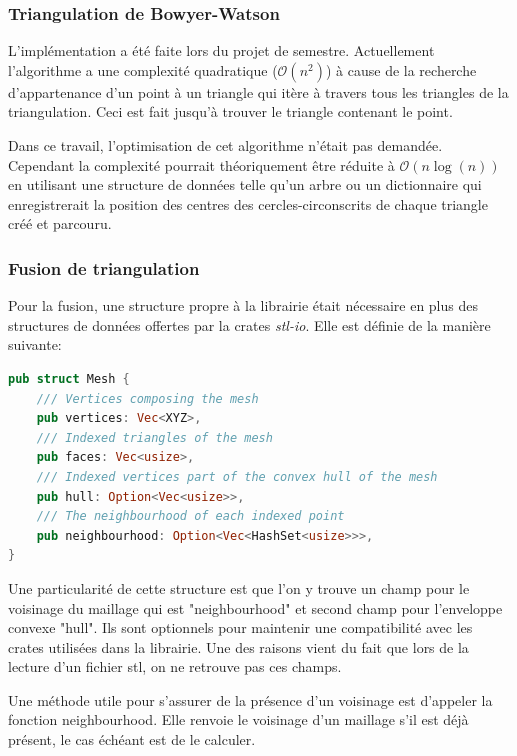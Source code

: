 \subsubsection{Triangulation de Bowyer-Watson}

L'implémentation a été faite lors du projet de semestre. 
Actuellement l'algorithme a une complexité quadratique ($\mathcal{O}(n^2)$) à cause de la 
recherche d'appartenance d'un point à un triangle qui itère à travers tous les
triangles de la triangulation. Ceci est fait jusqu'à trouver le triangle contenant le point.

Dans ce travail, l'optimisation de cet algorithme n'était pas demandée.
Cependant la complexité pourrait théoriquement être réduite à $\mathcal{O}(n \log(n))$ en
utilisant une structure de données telle qu'un arbre ou un dictionnaire
qui enregistrerait la position des centres des
cercles-circonscrits de chaque triangle créé et parcouru.

\subsubsection{Fusion de triangulation}

Pour la fusion, une structure propre à la librairie était nécessaire en plus des structures de données offertes par la crates \textit{stl-io}.
Elle est définie de la manière suivante:

\begin{lstlisting}[language=Rust, style=boxed]
pub struct Mesh {
    /// Vertices composing the mesh
    pub vertices: Vec<XYZ>,
    /// Indexed triangles of the mesh
    pub faces: Vec<usize>,
    /// Indexed vertices part of the convex hull of the mesh
    pub hull: Option<Vec<usize>>,
    /// The neighbourhood of each indexed point
    pub neighbourhood: Option<Vec<HashSet<usize>>>,
}
\end{lstlisting}

Une particularité de cette structure est que l'on y trouve un champ pour le voisinage du maillage qui est "neighbourhood" et second champ pour l'enveloppe convexe "hull".
Ils sont optionnels pour maintenir une compatibilité avec les crates utilisées dans la librairie.
Une des raisons vient du fait que lors de la lecture d'un fichier \gls{stl}, on ne retrouve pas ces champs. 

Une méthode utile pour s'assurer de la présence d'un voisinage est d'appeler la fonction neighbourhood.
Elle renvoie le voisinage d'un maillage s'il est déjà présent, le cas échéant est de le calculer.

